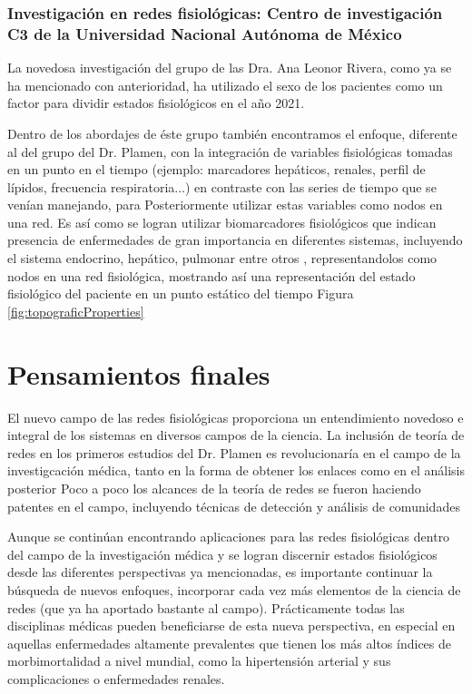 \documentclass[twoside,twocolumn]{article}
\begin{document}
\subsubsection{Investigación en redes fisiológicas: Centro de investigación C3 de la Universidad Nacional Autónoma de México}
La novedosa investigación del grupo de las Dra. Ana Leonor Rivera, como ya se ha mencionado con anterioridad, ha utilizado el sexo de los pacientes como un factor para dividir estados fisiológicos en el año 2021\cite{barajas2021sex}.

Dentro de los abordajes de éste grupo también encontramos el enfoque, diferente al del grupo del Dr. Plamen, con la integración de variables fisiológicas tomadas en un punto en el tiempo (ejemplo: marcadores hepáticos, renales, perfil de lípidos, frecuencia respiratoria...) en contraste con las series de tiempo que se venían manejando, para Posteriormente utilizar estas variables como nodos en una red.
Es así como se logran utilizar biomarcadores fisiológicos que indican presencia de enfermedades de gran importancia en diferentes sistemas, incluyendo el sistema endocrino, hepático, pulmonar entre otros \cite{barajas2021physiological}, representandolos como nodos en una red fisiológica, mostrando así una representación del estado fisiológico del paciente en un punto estático del tiempo Figura \ref{fig:topograficProperties}

\section{Pensamientos finales}
El nuevo campo de las redes fisiológicas proporciona un entendimiento novedoso e integral de los sistemas en diversos campos de la ciencia.
La inclusión de teoría de redes en los primeros estudios del Dr. Plamen es revolucionaría en el campo de la investigcación médica, tanto en la forma de obtener los enlaces como en el análisis posterior
Poco a poco los alcances de la teoría de redes se fueron haciendo patentes en el campo, incluyendo técnicas de detección\cite{barajas2021physiological} y análisis de comunidades\cite{liu2015major}

Aunque se continúan encontrando aplicaciones para las redes fisiológicas dentro del campo de la investigación médica y se logran discernir estados fisiológicos desde las diferentes perspectivas ya mencionadas, es importante continuar la búsqueda de nuevos enfoques, incorporar cada vez más elementos de la ciencia de redes (que ya ha aportado bastante al campo). 
Prácticamente todas las disciplinas médicas pueden beneficiarse de esta nueva perspectiva, en especial en aquellas enfermedades altamente prevalentes que tienen los más altos índices de morbimortalidad a nivel mundial, como la hipertensión arterial y sus complicaciones o enfermedades renales.
\end{document}
